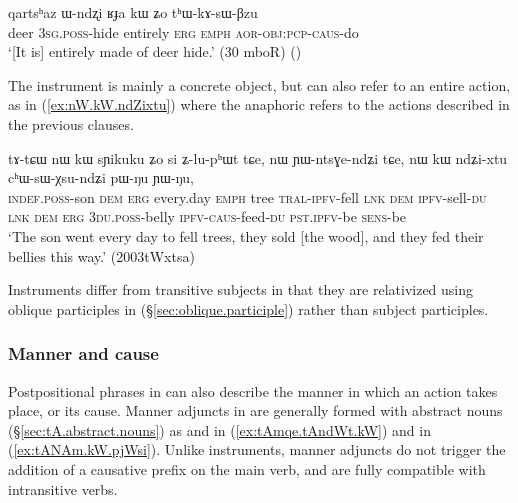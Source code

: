  \begin{exe} 
\ex \label{ex:instr4}
\gll   qartsʰaz ɯ-ndʐi ʁɟa kɯ ʑo tʰɯ-kɤ-sɯ-βzu  \\
 deer \textsc{3sg}.\textsc{poss}-hide entirely \textsc{erg} \textsc{emph} \textsc{aor}-\textsc{obj}:\textsc{pcp}-\textsc{caus}-do\\
 \glt   `[It is] entirely made of deer hide.' (30 mboR)
()
\end{exe} 

The instrument is mainly a concrete object, but can also refer to an entire action, as in (\ref{ex:nW.kW.ndZixtu}) where the anaphoric  refers to the actions described in the previous clauses.

\begin{exe}
\ex \label{ex:nW.kW.ndZixtu}
 \gll tɤ-tɕɯ nɯ kɯ sɲikuku ʑo si ʑ-lu-pʰɯt tɕe, nɯ ɲɯ-ntsɣe-ndʑi tɕe,  nɯ kɯ ndʑi-xtu cʰɯ-sɯ-χsu-ndʑi pɯ-ŋu ɲɯ-ŋu,  \\
 \textsc{indef}.\textsc{poss}-son \textsc{dem} \textsc{erg} every.day \textsc{emph} tree \textsc{tral}-\textsc{ipfv}-fell \textsc{lnk} \textsc{dem} \textsc{ipfv}-sell-\textsc{du} \textsc{lnk} \textsc{dem} \textsc{erg} \textsc{3du}.\textsc{poss}-belly \textsc{ipfv}-\textsc{caus}-feed-\textsc{du} \textsc{pst}.\textsc{ipfv}-be \textsc{sens}-be \\
 \glt `The son went every day to fell trees, they sold [the wood], and they fed their bellies this way.' (2003tWxtsa)
\end{exe}

Instruments differ from transitive subjects in that they are relativized using oblique participles in  (§\ref{sec:oblique.participle}) rather than subject participles.
 

\subsubsection{Manner and cause} \label{sec:manner.nominal.kW}
Postpositional phrases in  can also describe the manner in which an action takes place, or its cause. Manner adjuncts in  are generally formed with abstract nouns (§\ref{sec:tA.abstract.nouns}) as  and   in (\ref{ex:tAmqe.tAndWt.kW}) and  in (\ref{ex:tANAm.kW.pjWsi}). Unlike instruments, manner adjuncts do not trigger the addition of a causative prefix on the main verb, and are fully compatible with intransitive verbs.

